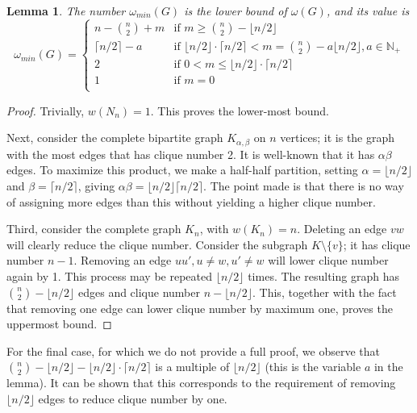 \documentclass{cslthse-msc}
\newtheorem{lemma}{Lemma}
\begin{document}
\begin{lemma}\label{lemma1}
The number $\omega_{min}(G)$ is the lower bound of $\omega(G)$, and its value is
\[
\omega_{min}(G) = 
\begin{cases}
	  n - \binom{n}{2} + m & \text{if } m \geq \binom{n}{2} - \lfloor n/2 \rfloor \\
	  \lceil n / 2 \rceil - a & \text{if }  \lfloor n / 2 \rfloor \cdot \lceil n / 2 \rceil < m = \binom{n}{2} - a \lfloor n/2 \rfloor, a \in \mathbb{N}_+ \\
	  2 & \text{if } 0 < m \leq \lfloor n / 2 \rfloor \cdot \lceil n / 2 \rceil \\
	  1 & \text{if } m = 0 \\
\end{cases}
\]
\end{lemma}


\begin{proof}
 Trivially, $w(N_n) = 1$. This proves the lower-most bound.
 
 Next, consider the complete bipartite graph $K_{\alpha,\beta}$ on $n$ vertices; it is the graph with the most edges that has clique number 2. It is well-known that it has $\alpha \beta$ edges. To maximize this product, we make a half-half partition, setting $\alpha = \lfloor n / 2 \rfloor$ and $\beta = \lceil n / 2 \rceil$, giving $\alpha \beta = \lfloor n / 2 \rfloor \lceil n / 2 \rceil$. The point made is that there is no way of assigning more edges than this without yielding a higher clique number.
 
 Third, consider the complete graph $K_n$, with $w(K_n) = n$. Deleting an edge $vw$ will clearly reduce the clique number. Consider the subgraph $K \setminus \{v\}$; it has clique number $n - 1$. Removing an edge $uu', u \neq w, u' \neq w$ will lower clique number again by 1. This process may be repeated $\lfloor n / 2 \rfloor$ times. The resulting graph has $\binom{n}{2} - \lfloor n/2 \rfloor$ edges and clique number $n - \lfloor n/2 \rfloor$. This, together with the fact that removing one edge can lower clique number by maximum one, proves the uppermost bound. 
\end{proof}
For the final case, for which we do not provide a full proof, we observe that $\binom{n}{2} - \lfloor n/2 \rfloor - \lfloor n / 2 \rfloor \cdot \lceil n / 2 \rceil$ is a multiple of $\lfloor n/2 \rfloor$ (this is the variable $a$ in the lemma). It can be shown that this corresponds to the requirement of removing $\lfloor n/2 \rfloor$ edges to reduce clique number by one.
\end{document}
